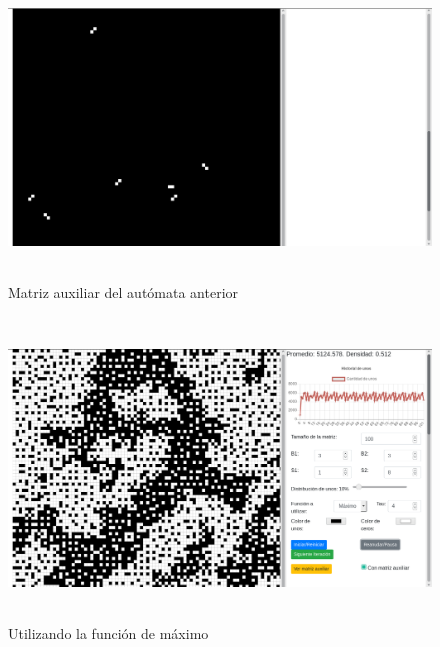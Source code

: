 \documentclass[12pt, titlepage]{article}
\begin{document}
\begin{figure}[H]
\begin{center}
 \includegraphics[width=15cm, height=8cm]{./img/3318-min-aux.png}
 \caption{Matriz auxiliar del autómata anterior}
 \label{fig:3318-min-aux}
\end{center}
\end{figure}

\begin{figure}[H]
\begin{center}
 \includegraphics[width=15cm, height=8cm]{./img/3318-max.png}
 \caption{Utilizando la función de máximo}
 \label{fig:3318-max}
\end{center}
\end{figure}
\end{document}
